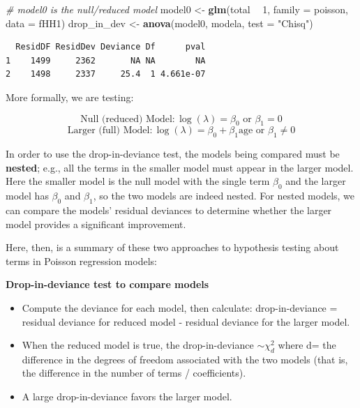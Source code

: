 \documentclass[
]{krantz}
\newenvironment{Shaded}{\begin{snugshade}}{\end{snugshade}}
\newcommand{\CommentTok}[1]{\textcolor[rgb]{0.37,0.37,0.37}{\textit{#1}}}
\newcommand{\DataTypeTok}[1]{\textcolor[rgb]{0.27,0.27,0.27}{#1}}
\newcommand{\DecValTok}[1]{\textcolor[rgb]{0.06,0.06,0.06}{#1}}
\newcommand{\KeywordTok}[1]{\textcolor[rgb]{0.27,0.27,0.27}{\textbf{#1}}}
\newcommand{\NormalTok}[1]{#1}
\newcommand{\OperatorTok}[1]{\textcolor[rgb]{0.43,0.43,0.43}{\textbf{#1}}}
\newcommand{\StringTok}[1]{\textcolor[rgb]{0.5,0.5,0.5}{#1}}
\providecommand{\tightlist}{%
  \setlength{\itemsep}{0pt}\setlength{\parskip}{0pt}}
\begin{document}
\begin{Shaded}
\begin{Highlighting}[]
\CommentTok{# model0 is the null/reduced model}
\NormalTok{model0 <-}\StringTok{ }\KeywordTok{glm}\NormalTok{(total }\OperatorTok{~}\StringTok{ }\DecValTok{1}\NormalTok{, }\DataTypeTok{family =}\NormalTok{ poisson, }\DataTypeTok{data =}\NormalTok{ fHH1)}
\NormalTok{drop_in_dev <-}\StringTok{ }\KeywordTok{anova}\NormalTok{(model0, modela, }\DataTypeTok{test =} \StringTok{"Chisq"}\NormalTok{)}
\end{Highlighting}
\end{Shaded}

\begin{verbatim}
  ResidDF ResidDev Deviance Df      pval
1    1499     2362       NA NA        NA
2    1498     2337     25.4  1 4.661e-07
\end{verbatim}

More formally, we are testing:

\[\textrm{Null (reduced) Model}: \log(\lambda) = \beta_0 \textrm{ or } \beta_1=0\]
\[\textrm{Larger (full) Model}: \log(\lambda) = \beta_0 + \beta_1\textrm{age} \textrm{ or } \beta_1 \neq 0 \]

In order to use the drop-in-deviance test, the models being compared must be \textbf{nested};  e.g., all the terms in the smaller model must appear in the larger model. Here the smaller model is the null model with the single term \(\beta_0\) and the larger model has \(\beta_0\) and \(\beta_1\), so the two models are indeed nested. For nested models, we can compare the models' residual deviances to determine whether the larger model provides a significant improvement.

Here, then, is a summary of these two approaches to hypothesis testing about terms in Poisson regression models:

\textbf{Drop-in-deviance test to compare models} 

\begin{itemize}
\tightlist
\item
  Compute the deviance for each model, then calculate: drop-in-deviance = residual deviance for reduced model - residual deviance for the larger model.
\item
  When the reduced model is true, the drop-in-deviance \(\sim \chi^2_d\)
  where d= the difference in the degrees of freedom associated with the two models (that is, the difference in the number of terms / coefficients).
\item
  A large drop-in-deviance favors the larger model.
\end{itemize}
\end{document}
